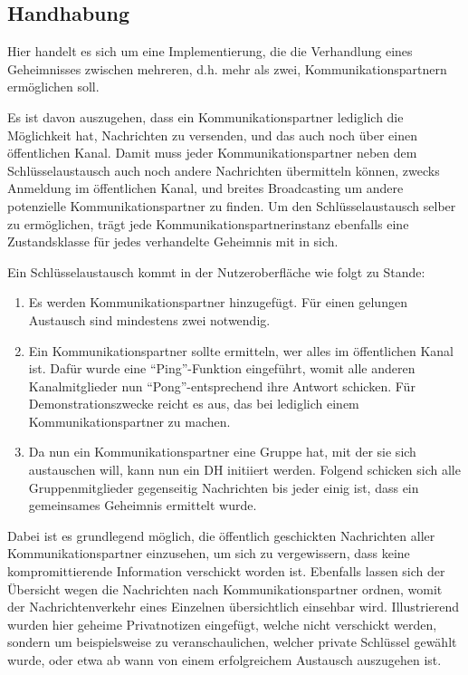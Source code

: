 \documentclass[conference]{IEEEtran}
\begin{document}
\subsection{Handhabung}

Hier handelt es sich um eine Implementierung, die die Verhandlung eines Geheimnisses
zwischen mehreren, d.h. mehr als zwei, Kommunikationspartnern ermöglichen soll.

Es ist davon auszugehen, dass ein Kommunikationspartner lediglich die Möglichkeit hat,
Nachrichten zu versenden, und das auch noch über einen öffentlichen Kanal.
Damit muss jeder Kommunikationspartner neben dem Schlüsselaustausch
auch noch andere Nachrichten übermitteln können, zwecks Anmeldung im öffentlichen Kanal,
und breites Broadcasting um andere potenzielle Kommunikationspartner zu finden.
Um den Schlüsselaustausch selber zu ermöglichen, trägt jede Kommunikationspartnerinstanz
ebenfalls eine Zustandsklasse für jedes verhandelte Geheimnis mit in sich.

Ein Schlüsselaustausch kommt in der Nutzeroberfläche wie folgt zu Stande:
\begin{enumerate}
    \item Es werden Kommunikationspartner hinzugefügt. Für einen gelungen Austausch sind mindestens zwei notwendig.
    \item Ein Kommunikationspartner sollte ermitteln, wer alles im öffentlichen Kanal ist. Dafür wurde eine \enquote{Ping}-Funktion eingeführt, womit alle anderen Kanalmitglieder nun \enquote{Pong}-entsprechend ihre Antwort schicken. Für Demonstrationszwecke reicht es aus, das bei lediglich einem Kommunikationspartner zu machen.
    \item Da nun ein Kommunikationspartner eine Gruppe hat, mit der sie sich austauschen will, kann nun ein DH initiiert werden. Folgend schicken sich alle Gruppenmitglieder gegenseitig Nachrichten bis jeder einig ist, dass ein gemeinsames Geheimnis ermittelt wurde.
\end{enumerate}

Dabei ist es grundlegend möglich, die öffentlich geschickten Nachrichten aller Kommunikationspartner einzusehen, um sich zu vergewissern, dass keine kompromittierende Information verschickt worden ist. Ebenfalls lassen sich der Übersicht wegen die Nachrichten nach Kommunikationspartner ordnen, womit der Nachrichtenverkehr eines Einzelnen übersichtlich einsehbar wird.
Illustrierend wurden hier geheime Privatnotizen eingefügt,
welche nicht verschickt werden, sondern um beispielsweise zu veranschaulichen,
welcher private Schlüssel gewählt wurde, oder etwa ab wann von einem
erfolgreichem Austausch auszugehen ist.
\end{document}
